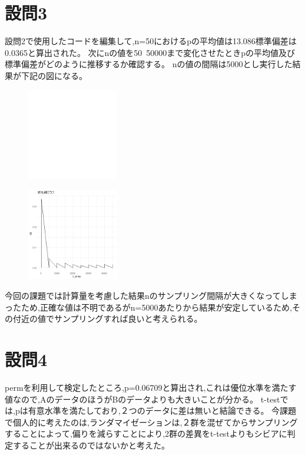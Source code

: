 \documentclass[fontsize = 10pt, paper= a4,twocolumn,column_gap=5zw]{jlreq}
\begin{document}
\section{設問3}
    設問2で使用したコードを編集して,n=50におけるpの平均値は13.086標準偏差は0.0365と算出された。
    次にnの値を50~50000まで変化させたときpの平均値及び標準偏差がどのように推移するか確認する。
    nの値の間隔は5000とし実行した結果が下記の図になる。
    \begin{figure}
        \centering
        \includegraphics[width=4cm]{6-4.png}
    \end{figure}
    \begin{figure}
        \centering
        \includegraphics[width=4cm]{6-5.png}
    \end{figure}
    今回の課題では計算量を考慮した結果nのサンプリング間隔が大きくなってしまったため,正確な値は不明であるがn=5000あたりから結果が安定しているため,その付近の値でサンプリングすれば良いと考えられる。


\section{設問4}
    permを利用して検定したところ,p=0.06709と算出され,これは優位水準を満たす値なので,AのデータのほうがBのデータよりも大きいことが分かる。
    t-testでは,pは有意水準を満たしており,２つのデータに差は無いと結論できる。
    今課題で個人的に考えたのは,ランダマイゼーションは,２群を混ぜてからサンプリングすることによって,偏りを減らすことにより,2群の差異をt-testよりもシビアに判定することが出来るのではないかと考えた。
\end{document}
